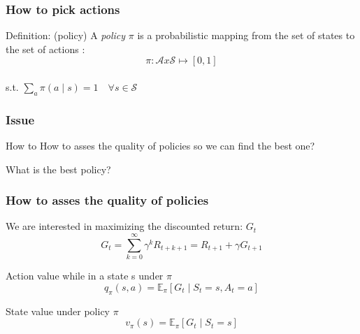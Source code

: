 \documentclass[dvipsnames,svgnames]{beamer}
\begin{document}
%





\begin{frame}
\frametitle{How to pick actions}
\begin{block}{Definition: (policy)}
A \emph{policy} $\pi$ is a probabilistic mapping from the set of states to the set of actions : 
$$ \pi : \mathcal{A} x \mathcal{S} \mapsto [0,1] $$
\\
s.t. $\underset{a}{\sum } \pi(a\mid s)=1 \quad \forall s \in \mathcal{S}$

\end{block}
\end{frame}

\begin{frame}
\frametitle{Issue}
\begin{alertblock}{How to}
How to asses the quality of policies so we can find the best one? 

What is the best policy?
\end{alertblock}
\end{frame}

\begin{frame}
\frametitle{How to asses the quality of policies}
\begin{block}{We are interested in maximizing the discounted return: $G_t$}
$$ G_t= \sum_{k=0}^{\infty}\gamma^k R_{t+k+1} = R_{t+1} + \gamma G_{t+1}$$
\end{block}

\pause
\begin{block}{Action value while in a state s under $\pi$}
\begin{equation*}
q_{\pi}(s,a) = \mathbb{E}_{\pi}[G_t\mid S_t =s,A_t=a]
\end{equation*}
\end{block}

\pause
\begin{block}{State value under policy $\pi$}
\begin{equation*}
v_{\pi}(s)=\mathbb{E}_{\pi}[G_t \mid S_t=s]
\end{equation*}
\end{block}



\end{frame}
\end{document}

